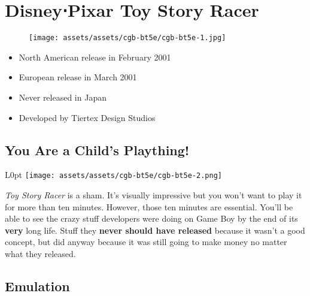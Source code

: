 \documentclass{book}
\begin{document}
\begingroup \chapter*{Disney⋅Pixar Toy Story Racer} \endgroup
\begin{figure}[H]
\vskip 4pt
\centering
\texttt{[image: assets/assets/cgb-bt5e/cgb-bt5e-1.jpg]}\end{figure}
\begin{itemize} [nosep]




\item North American release in February 2001







\item European release in March 2001








\item Never released in Japan





\item Developed by Tiertex Design Studios

\end{itemize}\noindent

\newpage\FloatBarrier\needspace{10mm}\section*{You Are a Child’s Plaything!}\nopagebreak[4]
\begin{wrapfigure}{L}{0pt} \texttt{[image: assets/assets/cgb-bt5e/cgb-bt5e-2.png]}\end{wrapfigure}
\emph{Toy Story Racer} is a sham. It’s visually impressive but you won’t want to play it for more than ten minutes. However, those ten minutes are essential. You’ll be able to see the crazy stuff developers were doing on Game Boy by the end of its \textbf{very} long life. Stuff they \textbf{never should have released} because it wasn’t a good concept, but did anyway because it was still going to make money no matter what they released.

\FloatBarrier\needspace{10mm}\section*{Emulation}\nopagebreak[4]
\end{document}

